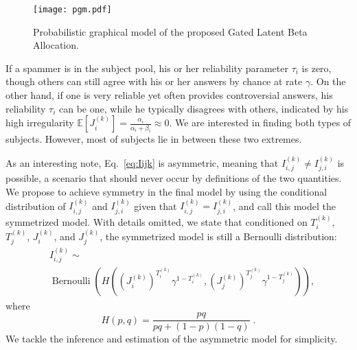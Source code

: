 \documentclass[10pt,journal,letterpaper,compsoc,twoside]{IEEEtran}
\newcommand{\tmop}[1]{\ensuremath{\operatorname{#1}}}
\begin{document}
\begin{figure}[ht!]
\centering
\texttt{[image: pgm.pdf]}
\caption{Probabilistic graphical model of the proposed Gated Latent Beta Allocation.}
\label{fig:pgm}
\end{figure}

If a spammer is in the subject pool, his or her reliability parameter $\tau_i$ is zero,
though others can still agree with his or her answers by chance at rate $\gamma$.
On the other hand, if one is very reliable yet often provides controversial
answers, his reliability $\tau_i$ can be one, while he typically disagrees 
with others, indicated by his high irregularity $\mathbb E[J_i^{(k)}] = \frac{\alpha_i}{\alpha_i+\beta_i}\approx 0$. We are interested in finding both types of subjects. However, most of
subjects lie in between these two extremes. 

As an interesting note, Eq.~\eqref{eq:Iijk} is asymmetric, meaning that
$I_{i,j}^{(k)}\neq I_{j,i}^{(k)}$ is possible, a scenario that should never occur by definitions of the two quantities.  We propose to achieve symmetry in the final model by
using the conditional distribution of $I_{i,j}^{(k)}$ and $I_{j,i}^{(k)}$ given that 
$I_{i,j}^{(k)}=I_{j,i}^{(k)}$, and call this model the symmetrized model.
With details omitted, we state that conditioned on $T_i^{(k)}$, $T_j^{(k)}$, $J_i^{(k)}$, and $J_j^{(k)}$, the symmetrized model is still a Bernoulli distribution: 
\begin{equation}
\begin{split}
&I_{i,j}^{( k )} \sim \\
&\tmop{Bernoulli} \left( H\left(\left(J_{i}^{( k )}\right)^{T_i^{(k)}}\gamma^{1-T_i^{(k)}}, 
 \left(J_{j}^{( k )}\right)^{T_j^{(k)}} \gamma^{1-T_j^{(k)}}\right) \right),
\end{split}
\end{equation}
where 
\begin{equation}
H(p,q)=\dfrac{pq}{pq + (1-p)(1-q)}\;.\nonumber
\end{equation}
We tackle the inference and estimation of the asymmetric model for simplicity.
\end{document}
